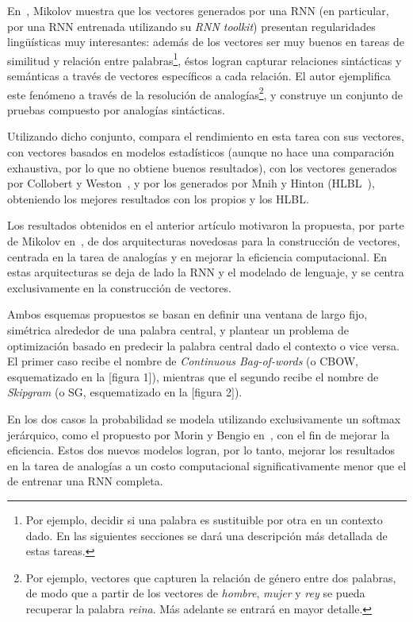 En~\cite{Mikolov2013a}, Mikolov muestra que los vectores generados por una RNN (en particular, por
una RNN entrenada utilizando su \textit{RNN toolkit}) presentan regularidades lingüísticas muy
interesantes: además de los vectores ser muy buenos en tareas de similitud y relación entre
palabras\footnote{Por ejemplo, decidir si una palabra es sustituible por otra en un contexto
dado. En las siguientes secciones se dará una descripción más detallada de estas tareas.}, éstos
logran capturar relaciones sintácticas y semánticas a través de vectores específicos a cada
relación. El autor ejemplifica este fenómeno a través de la resolución de analogías\footnote{Por
ejemplo, vectores que capturen la relación de género entre dos palabras, de modo que a partir de los
vectores de \textit{hombre}, \textit{mujer} y \textit{rey} se pueda recuperar la palabra
\textit{reina}. Más adelante se entrará en mayor detalle.}, y construye un conjunto de pruebas
compuesto por analogías sintácticas.

Utilizando dicho conjunto, compara el rendimiento en esta tarea con sus vectores, con vectores
basados en modelos estadísticos (aunque no hace una comparación exhaustiva, por lo que no obtiene
buenos resultados), con los vectores generados por Collobert y Weston~\cite{CollobertWeston2008}, y
por los generados por Mnih y Hinton (HLBL~\cite{MnihHinton2009}), obteniendo los mejores resultados
con los propios y los HLBL\@.

Los resultados obtenidos en el anterior artículo motivaron la propuesta, por parte de Mikolov
en~\cite{Mikolov2013b}, de dos arquitecturas novedosas para la construcción de vectores, centrada en
la tarea de analogías y en mejorar la eficiencia computacional. En estas arquitecturas se deja de
lado la RNN y el modelado de lenguaje, y se centra exclusivamente en la construcción de vectores.

Ambos esquemas propuestos se basan en definir una ventana de largo fijo, simétrica alrededor de una
palabra central, y plantear un problema de optimización basado en predecir la palabra central dado
el contexto o vice versa. El primer caso recibe el nombre de \textit{Continuous Bag-of-words} (o
CBOW, esquematizado en la [figura 1]), mientras que el segundo recibe el nombre de \textit{Skipgram}
(o SG, esquematizado en la [figura 2]).

En los dos casos la probabilidad se modela utilizando exclusivamente un softmax jerárquico, como el
propuesto por Morin y Bengio en~\cite{MorinBengio2005}, con el fin de mejorar la eficiencia. Estos
dos nuevos modelos logran, por lo tanto, mejorar los resultados en la tarea de analogías a un costo
computacional significativamente menor que el de entrenar una RNN completa.

